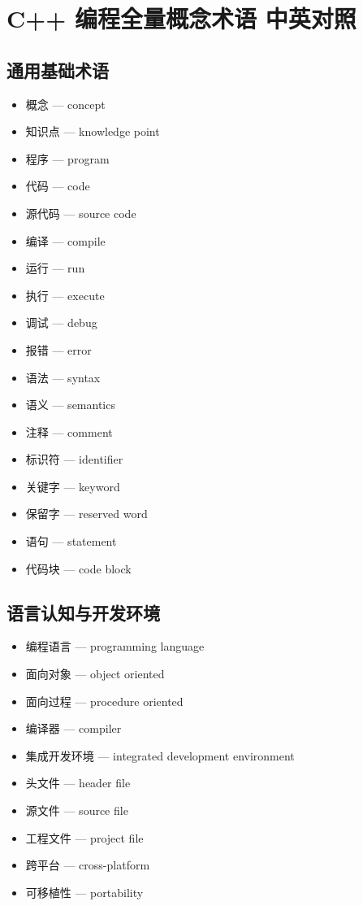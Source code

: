 
\section{C++ 编程全量概念术语 中英对照}

\subsection{通用基础术语}
\begin{itemize}
\item 概念 — concept
\item 知识点 — knowledge point
\item 程序 — program
\item 代码 — code
\item 源代码 — source code
\item 编译 — compile
\item 运行 — run
\item 执行 — execute
\item 调试 — debug
\item 报错 — error
\item 语法 — syntax
\item 语义 — semantics
\item 注释 — comment
\item 标识符 — identifier
\item 关键字 — keyword
\item 保留字 — reserved word
\item 语句 — statement
\item 代码块 — code block
\end{itemize}

\subsection{语言认知与开发环境}
\begin{itemize}
\item 编程语言 — programming language
\item 面向对象 — object oriented
\item 面向过程 — procedure oriented
\item 编译器 — compiler
\item 集成开发环境 — integrated development environment
\item 头文件 — header file
\item 源文件 — source file
\item 工程文件 — project file
\item 跨平台 — cross-platform
\item 可移植性 — portability
\end{itemize}

